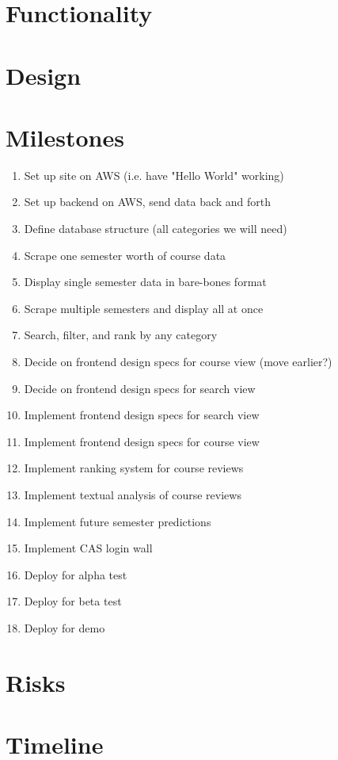 \documentclass[11pt]{article}
\begin{document}
\section{Functionality}

\section{Design}

\section{Milestones}
\begin{enumerate}
\item Set up site on AWS (i.e. have "Hello World" working)
\item Set up backend on AWS, send data back and forth
\item Define database structure (all categories we will need)
\item Scrape one semester worth of course data
\item Display single semester data in bare-bones format
\item Scrape multiple semesters and display all at once
\item Search, filter, and rank by any category
\item Decide on frontend design specs for course view (move earlier?)
\item Decide on frontend design specs for search view
\par [No particular order from here on out]
\item Implement frontend design specs for search view
\item Implement frontend design specs for course view
\item Implement ranking system for course reviews
\item Implement textual analysis of course reviews
\item Implement future semester predictions
\item Implement CAS login wall
\item Deploy for alpha test
\item Deploy for beta test
\item Deploy for demo
\end{enumerate}
\section{Risks}

\section{Timeline}
\end{document}
